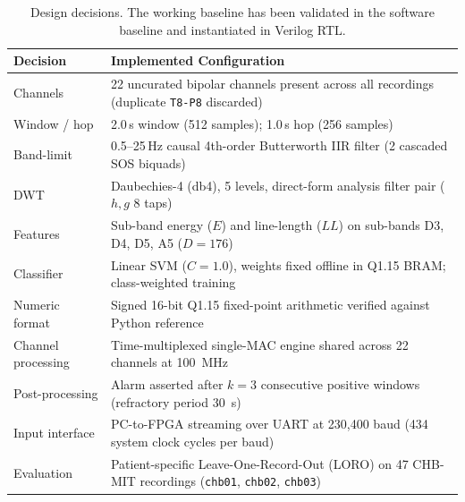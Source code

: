 \documentclass[10pt,twocolumn,letterpaper]{article}
\begin{document}
\begin{table}[t]
\centering
\caption{Design decisions. The working baseline has been validated in the software baseline and instantiated in Verilog RTL.}
\label{tab:decisions}
\small
\begin{tabularx}{\textwidth}{@{}p{3.2cm}X@{}}
\toprule
Decision & Implemented Configuration \\
\midrule
Channels & 22 uncurated bipolar channels present across all recordings (duplicate \texttt{T8-P8} discarded) \\
Window / hop & 2.0\,s window (512 samples); 1.0\,s hop (256 samples) \\
Band-limit & 0.5--25\,Hz causal 4th-order Butterworth IIR filter (2 cascaded SOS biquads) \\
DWT & Daubechies-4 (db4), 5 levels, direct-form analysis filter pair ($h, g$ 8 taps) \\
Features & Sub-band energy ($E$) and line-length ($LL$) on sub-bands D3, D4, D5, A5 ($D=176$) \\
Classifier & Linear SVM ($C=1.0$), weights fixed offline in Q1.15 BRAM; class-weighted training \\
Numeric format & Signed 16-bit Q1.15 fixed-point arithmetic verified against Python reference \\
Channel processing & Time-multiplexed single-MAC engine shared across 22 channels at 100~MHz \\
Post-processing & Alarm asserted after $k=3$ consecutive positive windows (refractory period 30~s) \\
Input interface & PC-to-FPGA streaming over UART at 230,400 baud (434 system clock cycles per baud) \\
Evaluation & Patient-specific Leave-One-Record-Out (LORO) on 47 CHB-MIT recordings (\texttt{chb01}, \texttt{chb02}, \texttt{chb03}) \\
\bottomrule
\end{tabularx}
\end{table}
\end{document}
